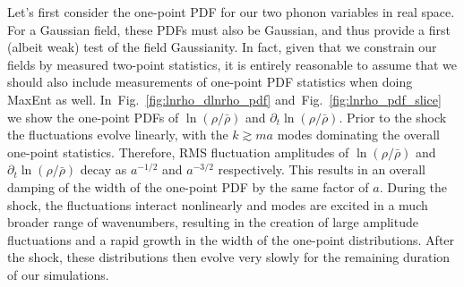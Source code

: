 \documentclass[11pt,a4paper]{article}
\newcommand{\figref}[1]{Fig.~\ref{#1}}
\def\lnr{\ln(\rho/\bar{\rho})}
\def\dlnr{\partial_t\ln(\rho/\bar{\rho})}
\begin{document}
Let's first consider the one-point PDF for our two phonon variables in real space.
For a Gaussian field, these PDFs must also be Gaussian, and thus provide a first (albeit weak) test of the field Gaussianity.
In fact, given that we constrain our fields by measured two-point statistics, it is entirely reasonable to assume that we should also include measurements of one-point PDF statistics when doing MaxEnt as well.
In~\figref{fig:lnrho_dlnrho_pdf} and~\figref{fig:lnrho_pdf_slice} we show the one-point PDFs of $\ln(\rho/\bar{\rho})$ and $\partial_t\ln(\rho/\bar{\rho})$.
Prior to the shock the fluctuations evolve linearly, with the $k \gtrsim ma$ modes dominating the overall one-point statistics.
Therefore, RMS fluctuation amplitudes of $\lnr$ and $\dlnr$ decay as $a^{-1/2}$ and $a^{-3/2}$ respectively.
This results in an overall damping of the width of the one-point PDF by the same factor of $a$.
During the shock, the fluctuations interact nonlinearly and modes are excited in a much broader range of wavenumbers, resulting in the creation of large amplitude fluctuations and a rapid growth in the width of the one-point distributions.
After the shock, these distributions then evolve very slowly for the remaining duration of our simulations.
\end{document}
